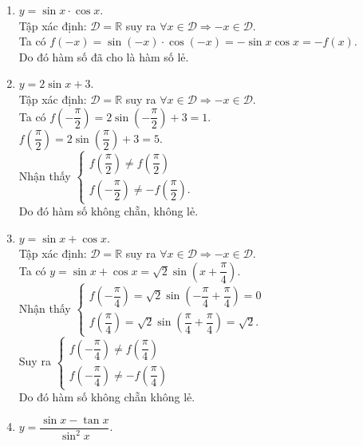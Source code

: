 \begin{ex}
{\begin{enumerate}
			 Ta có $f(-x)=\tan(-x)+\cot(-x)=-\tan x-\cot x=-(\tan x+\cot x)=-f(x)$.\\
			Do đó  hàm số đã cho là hàm số lẻ.
			 \item $y=\sin x\cdot \cos x$.\\
			Tập xác định: $\mathscr{D}=\mathbb{R}$ suy ra $\forall x \in  \mathscr{D} \Rightarrow -x \in \mathscr{D}$.\\
			Ta có $f(-x)=\sin(-x)\cdot \cos(-x)=-\sin x \cos x=-f(x)$.\\ 
			Do đó hàm  số đã cho là hàm số lẻ.
			\item $y=2\sin  x+3$.\\
			Tập xác  định: $\mathscr{D}=\mathbb{R}$ suy ra $\forall x \in \mathscr{D} \Rightarrow -x \in \mathscr{D}$.\\
			Ta có  $f\left(-\dfrac{\pi}{2}\right)=2\sin\left(-\dfrac{\pi}{2}\right)+3=1$.\\ $f\left(\dfrac{\pi}{2}\right)=2\sin\left(\dfrac{\pi}{2}\right)+3=5$.\\
			Nhận thấy $\begin{cases} f\left(\dfrac{\pi}{2}\right) \ne f\left(\dfrac{\pi}{2}\right) \\ f\left(-\dfrac{\pi}{2}\right) \ne -f\left(\dfrac{\pi}{2}\right).
		\end{cases}$\\
		Do đó hàm số  không chẵn, không lẻ.
		\item $y=\sin  x+\cos x$.\\
		Tập xác  định: $\mathscr{D} = \mathbb{R}$ suy ra $\forall x \in \mathscr{D} \Rightarrow -x \in \mathscr{D}$.\\
		Ta có $y = \sin x + \cos x =  \sqrt{2} \sin \left(x + \dfrac{\pi}{4}\right)$.\\
		Nhận thấy $\begin{cases} f\left(-\dfrac{\pi}{4}\right) = \sqrt{2} \sin \left(-\dfrac{\pi}{4} + \dfrac{\pi}{4}\right) = 0 \\ f\left(\dfrac{\pi}{4}\right) = \sqrt{2} \sin \left(\dfrac{\pi}{4} + \dfrac{\pi}{4}\right) = \sqrt{2}.
	\end{cases}$\\
	Suy ra $\begin{cases} f\left(-\dfrac{\pi}{4}\right) \ne f\left(\dfrac{\pi}{4}\right) \\ f\left(-\dfrac{\pi}{4}\right) \ne -f\left(\dfrac{\pi}{4}\right)
	\end{cases}$\\
	Do đó hàm  số không chẵn không lẻ.
	\item $y=\dfrac{\sin x-\tan x}{\sin^2 x}$.\\ 

\end{enumerate}}
\end{ex}
